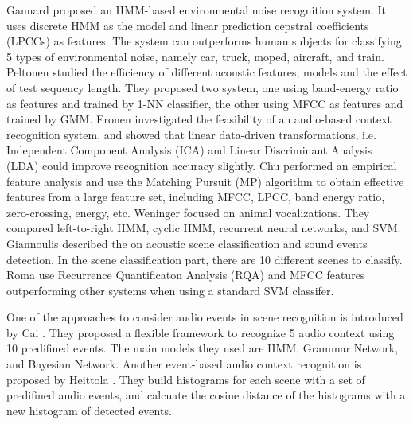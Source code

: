 Gaunard \cite{gaunard1998automatic} proposed an HMM-based environmental noise recognition system. 
It uses discrete HMM as the model and linear prediction cepstral coefficients (LPCCs) as features. 
The system can outperforms human subjects for classifying 5 types of environmental noise, namely car, truck, moped, aircraft, and train. 
Peltonen \cite{peltonen2001computational} studied the efficiency of different acoustic features, models and the effect of test sequency length. 
They proposed two system, one using band-energy ratio as features and trained by 1-NN classifier, the other using MFCC as features and trained by GMM. 
Eronen  \cite{eronen2006audio-based} investigated the feasibility of an audio-based context recognition system, and showed that linear data-driven transformations, i.e. Independent   Component Analysis (ICA) and Linear Discriminant Analysis (LDA) could improve recognition accuracy slightly. 
Chu \cite{chu2009environmental} performed an empirical feature analysis and use the Matching Pursuit (MP) algorithm to obtain effective features from a large feature set, including MFCC, LPCC, band energy ratio, zero-crossing, energy, etc. 
Weninger \cite{weninger2011audio} focused on animal vocalizations. They compared left-to-right HMM, cyclic HMM, recurrent neural networks, and SVM. \\

Giannoulis \cite{giannoulis2013applications} described the on acoustic scene classification and sound events detection.  
In the scene classification part, there are 10 different scenes to classify. 
Roma \cite{romarecurrence} use Recurrence Quantificaton Analysis (RQA) and MFCC features outperforming other systems when using a standard SVM classifer. 

One of the approaches to consider audio events in scene recognition is introduced by Cai  \cite{cai2006flexible}. 
They proposed a flexible framework to recognize 5 audio context using 10 predifined events. 
The main models they used are HMM, Grammar Network, and Bayesian Network. 
Another event-based audio context recognition is proposed by Heittola \cite{heittola2010audio}. 
They build histograms for each scene with a set of predifined audio events, and calcuate the cosine distance of the histograms with a new histogram of detected events.\\

